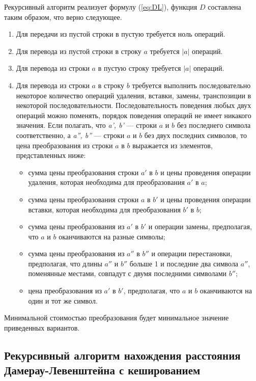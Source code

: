 Рекурсивный алгоритм реализует формулу (\ref{eq:DL}), функция $D$ составлена таким образом, что верно следующее.%
\begin{enumerate}[label=\arabic*)]
	\item Для передачи из пустой строки в пустую требуется ноль операций.
	\item Для перевода из пустой строки в строку $a$ требуется $|a|$ операций.
	\item Для перевода из строки $a$ в пустую строку требуется $|a|$ операций.
	\item Для перевода из строки $a$ в строку $b$ требуется выполнить последовательно некоторое количество операций удаления, вставки, замены, транспозиции в некоторой последовательности. Последовательность поведения любых двух операций можно поменять, порядок поведения операций не имеет никакого значения.
	Если полагать, что \textit{a', b'} --- строки $a$ и $b$ без последнего символа соответственно, а \textit{a'', b''} --- строки $a$ и $b$ без двух последних символов, то цена преобразования из строки $a$ в $b$ выражается из элементов, представленных ниже:
	\begin{itemize}[label=---]
		\item сумма цены преобразования строки $a'$ в $b$ и цены проведения операции удаления, которая необходима для преобразования $a'$ в $a$;
		\item сумма цены преобразования строки $a$ в $b'$  и цены проведения операции вставки, которая необходима для преобразования $b'$ в $b$;
		\item сумма цены преобразования из $a'$ в $b'$ и операции замены, предполагая, что $a$ и $b$ оканчиваются на разные символы;
		\item сумма цены преобразования из $a''$ в $b''$ и операции перестановки, предполагая, что длины $a''$ и $b''$ больше 1 и последние два символа $a''$, поменянные местами, совпадут с двумя последними символами $b''$;
		\item цена преобразования из $a'$ в $b'$, предполагая, что $a$ и $b$ оканчиваются на один и тот же символ.
	\end{itemize}
\end{enumerate}

Минимальной стоимостью преобразования будет минимальное значение приведенных вариантов.

\subsection{Рекурсивный алгоритм нахождения расстояния Дамерау-Левенштейна с кешированием}

